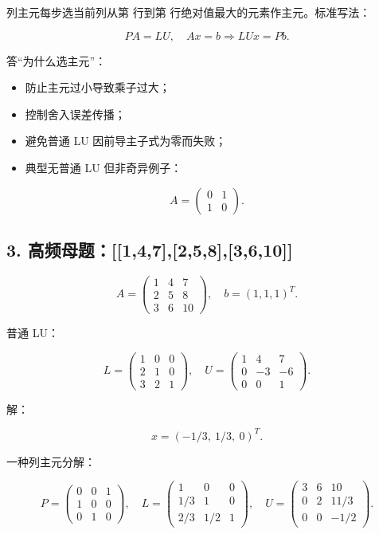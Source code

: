 \documentclass[11pt,a4paper]{ctexart}
\newcommand{\code}[1]{\begingroup\ttfamily\small #1\endgroup}
\begin{document}
列主元每步选当前列从第 \code{} 行到第 \code{} 行绝对值最大的元素作主元。标准写法：

\[
PA=LU,\quad Ax=b \Rightarrow LUx=Pb.
\]

答“为什么选主元”：

\begin{itemize}

\item 防止主元过小导致乘子过大；

\item 控制舍入误差传播；

\item 避免普通 LU 因前导主子式为零而失败；

\item 典型无普通 LU 但非奇异例子：

\end{itemize}

\[
A=\begin{pmatrix}0&1\\1&0\end{pmatrix}.
\]


\subsection*{3. 高频母题：[[1,4,7],[2,5,8],[3,6,10]]}


\[
A=\begin{pmatrix}1&4&7\\2&5&8\\3&6&10\end{pmatrix},\quad b=(1,1,1)^T.
\]

普通 LU：

\[
L=\begin{pmatrix}1&0&0\\2&1&0\\3&2&1\end{pmatrix},\quad
U=\begin{pmatrix}1&4&7\\0&-3&-6\\0&0&1\end{pmatrix}.
\]

解：

\[
x=(-1/3,\ 1/3,\ 0)^T.
\]

一种列主元分解：

\[
P=\begin{pmatrix}0&0&1\\1&0&0\\0&1&0\end{pmatrix},
\quad
L=\begin{pmatrix}1&0&0\\1/3&1&0\\2/3&1/2&1\end{pmatrix},
\quad
U=\begin{pmatrix}3&6&10\\0&2&11/3\\0&0&-1/2\end{pmatrix}.
\]
\end{document}
